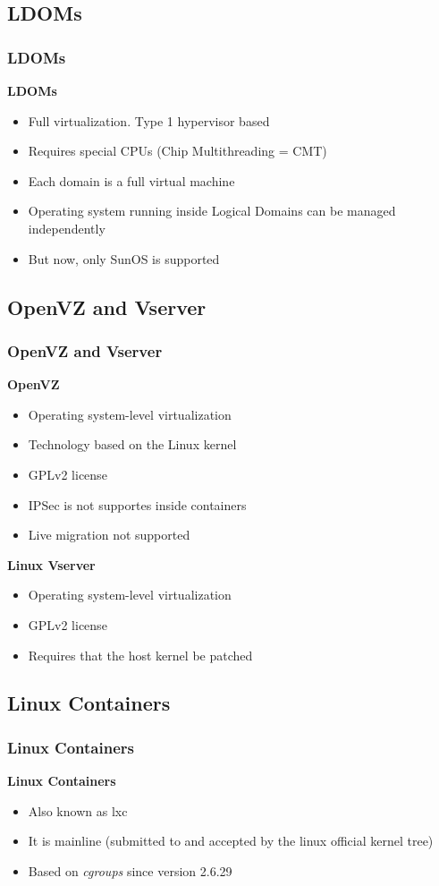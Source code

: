 \documentclass{beamer}
\begin{document}
  \subsection{LDOMs}
  \begin{frame}
    \frametitle{LDOMs}
    \textbf{LDOMs}
    \begin{itemize}
      \item Full virtualization. Type 1 hypervisor based
      \item Requires special CPUs (Chip Multithreading = CMT)
      \item Each domain is a full virtual machine
      \item Operating system running inside Logical Domains can be managed independently
      \item But now, only SunOS is supported
    \end{itemize}
  \end{frame}
  
  \subsection{OpenVZ and Vserver}
  \begin{frame}
    \frametitle{OpenVZ and Vserver}
    \textbf{OpenVZ}
    \begin{itemize}
      \item Operating system-level virtualization 
      \item Technology based on the Linux kernel 
      \item GPLv2 license
      \item IPSec is not supportes inside containers
      \item Live migration not supported
    \end{itemize}
    \textbf{Linux Vserver}
    \begin{itemize}
      \item Operating system-level virtualization
      \item GPLv2 license
      \item Requires that the host kernel be patched
    \end{itemize}
  \end{frame}
  
  \subsection{Linux Containers}
  \begin{frame}
    \frametitle{Linux Containers}
    \textbf{Linux Containers}
    \begin{itemize}
      \item Also known as lxc
      \item It is mainline (submitted to and accepted by the linux official kernel tree)
      \item Based on \textit{cgroups} since version 2.6.29
    \end{itemize}
  \end{frame}
\end{document}
